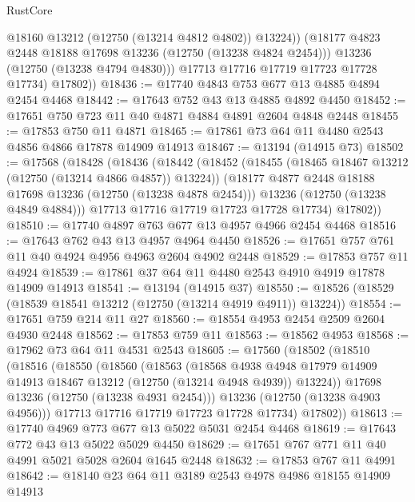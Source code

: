 \begin{lexlean}{RustCore}
\begin{coremodule}
                @18160
                @13212
                (@12750 (@13214 @4812 @4802))
                @13224))
            (@18177 @4823 @2448 @18188 @17698 @13236 (@12750 (@13238 @4824 @2454)))
            @13236
            (@12750 (@13238 @4794 @4830)))
          @17713
          @17716
          @17719
          @17723
          @17728
          @17734)
        @17802))
@18436 := @17740 @4843 @753 @677 @13 @4885 @4894 @2454 @4468
@18442 := @17643 @752 @43 @13 @4885 @4892 @4450
@18452 := @17651 @750 @723 @11 @40 @4871 @4884 @4891 @2604 @4848 @2448
@18455 := @17853 @750 @11 @4871
@18465 := @17861 @73 @64 @11 @4480 @2543 @4856 @4866 @17878 @14909 @14913
@18467 := @13194 (@14915 @73)
@18502 := @17568
    (@18428
      (@18436
        (@18442
          (@18452
            (@18455 (@18465 @18467 @13212 (@12750 (@13214 @4866 @4857)) @13224))
            (@18177 @4877 @2448 @18188 @17698 @13236 (@12750 (@13238 @4878 @2454)))
            @13236
            (@12750 (@13238 @4849 @4884)))
          @17713
          @17716
          @17719
          @17723
          @17728
          @17734)
        @17802))
@18510 := @17740 @4897 @763 @677 @13 @4957 @4966 @2454 @4468
@18516 := @17643 @762 @43 @13 @4957 @4964 @4450
@18526 := @17651 @757 @761 @11 @40 @4924 @4956 @4963 @2604 @4902 @2448
@18529 := @17853 @757 @11 @4924
@18539 := @17861 @37 @64 @11 @4480 @2543 @4910 @4919 @17878 @14909 @14913
@18541 := @13194 (@14915 @37)
@18550 := @18526 (@18529 (@18539 @18541 @13212 (@12750 (@13214 @4919 @4911)) @13224))
@18554 := @17651 @759 @214 @11 @27
@18560 := @18554 @4953 @2454 @2509 @2604 @4930 @2448
@18562 := @17853 @759 @11
@18563 := @18562 @4953
@18568 := @17962 @73 @64 @11 @4531 @2543
@18605 := @17560
    (@18502
      (@18510
        (@18516
          (@18550
            (@18560
              (@18563
                (@18568
                  @4938
                  @4948
                  @17979
                  @14909
                  @14913
                  @18467
                  @13212
                  (@12750 (@13214 @4948 @4939))
                  @13224))
              @17698
              @13236
              (@12750 (@13238 @4931 @2454)))
            @13236
            (@12750 (@13238 @4903 @4956)))
          @17713
          @17716
          @17719
          @17723
          @17728
          @17734)
        @17802))
@18613 := @17740 @4969 @773 @677 @13 @5022 @5031 @2454 @4468
@18619 := @17643 @772 @43 @13 @5022 @5029 @4450
@18629 := @17651 @767 @771 @11 @40 @4991 @5021 @5028 @2604 @1645 @2448
@18632 := @17853 @767 @11 @4991
@18642 := @18140 @23 @64 @11 @3189 @2543 @4978 @4986 @18155 @14909 @14913

\end{coremodule}
\end{lexlean}
